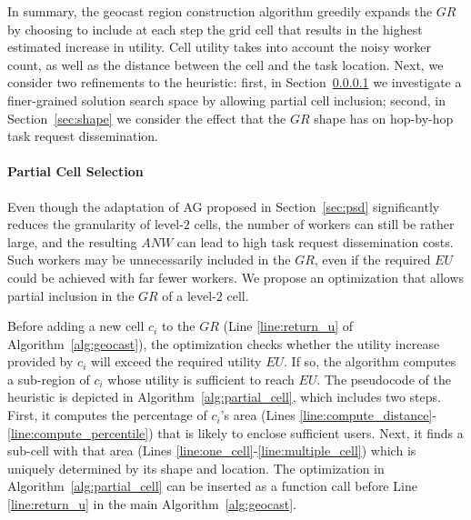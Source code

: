 \documentclass{USC-Thesis}
\numberwithin{equation}{chapter}
\begin{document}
In summary, the geocast region construction algorithm greedily expands the $\mathit{GR}$ by choosing to include at each step the grid cell that results in the highest estimated increase in utility. Cell utility takes into account the noisy worker count, as well as the distance between the cell and the task location. Next, we consider two refinements to the heuristic: first, in Section~\ref{sec:part_cell} we investigate a finer-grained solution search space by allowing partial cell inclusion; second, in Section~\ref{sec:shape} we consider the effect that the $\mathit{GR}$ shape has on hop-by-hop task request dissemination.

\paragraph{Partial Cell Selection}
\label{sec:part_cell}

Even though the adaptation of AG proposed in Section~\ref{sec:psd} significantly reduces the granularity of level-$2$ cells, the number of workers can still be rather large, and the resulting $\mathit{ANW}$ can lead to high task request dissemination costs. Such workers may be unnecessarily included in the $\mathit{GR}$, even if the required $\mathit{EU}$ could be achieved with far fewer workers. We propose an optimization that allows partial inclusion in the $\mathit{GR}$ of a level-$2$ cell.

Before adding a new cell $c_i$ to the $\mathit{GR}$ (Line \ref{line:return_u} of Algorithm~\ref{alg:geocast}), the optimization checks whether the utility increase provided by $c_i$ will exceed the required utility $\mathit{EU}$. If so, the algorithm computes a sub-region of $c_i$ whose utility is sufficient to reach $\mathit{EU}$. The pseudocode of the heuristic is depicted in Algorithm~\ref{alg:partial_cell}, which includes two steps. First, it computes the percentage of $c_i$'s area (Lines \ref{line:compute_distance}-\ref{line:compute_percentile}) that is likely to enclose sufficient users. Next, it finds a sub-cell with that area (Lines \ref{line:one_cell}-\ref{line:multiple_cell}) which is uniquely determined by its shape and location. The optimization in Algorithm~\ref{alg:partial_cell} can be inserted as a function call before Line \ref{line:return_u} in the main Algorithm~\ref{alg:geocast}.
\end{document}
